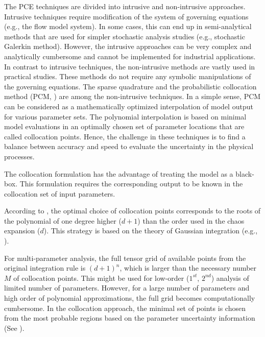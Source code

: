 The PCE techniques are divided into intrusive
\cite{Ghanem1993,Matthies2005,Xiu2003} and non-intrusive
\cite{Keese2003,Isukapalli1998,nLi2007,oladyshkinintegrative} approaches.
Intrusive techniques require modification of the system of governing
equations (e.g., the flow model system). In some cases, this can end up in semi-analytical methods that are
used for simpler stochastic analysis studies (e.g., stochastic Galerkin
method). However, the intrusive approaches can be very complex and analytically
cumbersome and cannot be implemented for industrial applications. In contrast
to intrusive techniques, the non-intrusive methods are vastly used in practical
studies. These methods do not require any symbolic manipulations of the
governing equations. The sparse quadrature and the probabilistic collocation
method (PCM, \cite{nLi2007,oladyshkinintegrative}) are among the non-intrusive
techniques. In a simple sense, PCM can be considered as a mathematically
optimized interpolation of model output for various parameter sets. The
polynomial interpolation is based on minimal model evaluations in an optimally
chosen set of parameter locations that are called collocation points. Hence, the challenge in these techniques is to find a balance between accuracy and speed
to evaluate the uncertainty in the physical processes.

The collocation formulation has the advantage of treating the model as a
black-box. This formulation requires the corresponding output to be known in
the collocation set of input parameters.

According to \cite{Villadsen1978}, the optimal choice of collocation
points corresponds to the roots of the polynomial of one degree higher ($d+1$)
than the order used in the chaos expansion ($d$). This strategy is based on the
theory of Gaussian integration (e.g., \cite{Abramowitz1965}). 

For multi-parameter analysis, the full tensor grid of available points from the
original integration rule is $(d+1)^n$, which is larger than the necessary
number
$M$ of collocation points. This might be used for low-order
($1^{st}$, $2^{nd}$) analysis of limited number of parameters. However, for
a large number of parameters and high order of polynomial approximations, the
full grid becomes computationally cumbersome. In the collocation approach,
the minimal set of points is chosen from the most probable regions based on the parameter uncertainty information (See
\cite{nLi2007,oladyshkinintegrative,oladyshkin2011concept}). 

